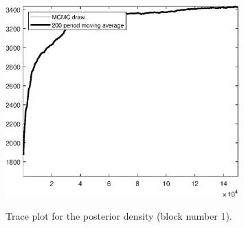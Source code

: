 \begin{figure}[H]
\centering
  \includegraphics[width=0.8\textwidth]{BRS_sectoral_wo_gmf/graphs/TracePlot_Posterior_blck_1}\\
    \caption{Trace plot for the posterior density (block number 1).}
\end{figure}

